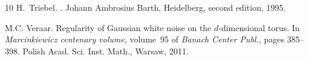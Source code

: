\documentclass[reqno]{amsart}
\theoremstyle{plain}
\theoremstyle{remark}
\theoremstyle{plain}
\numberwithin{equation}{section}
\newcommand{\1}{\one}
\begin{document}
\begin{thebibliography}{10}
H.~Triebel.
.
\newblock Johann Ambrosius Barth, Heidelberg, second edition, 1995.

M.C. Veraar.
\newblock Regularity of {G}aussian white noise on the {$d$}-dimensional torus.
\newblock In {\em Marcinkiewicz centenary volume}, volume~95 of {\em Banach
  Center Publ.}, pages 385--398. Polish Acad. Sci. Inst. Math., Warsaw, 2011.

\end{thebibliography}
\end{document}

